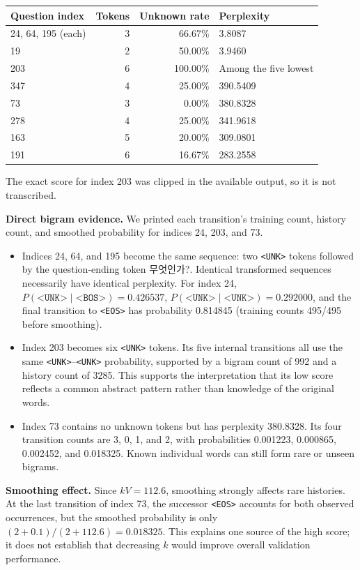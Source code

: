 \documentclass[11pt,a4paper]{article}
\newcommand{\KO}[1]{{\koreanfont #1}}
\newcommand{\unk}{\texttt{<UNK>}}
\newcommand{\bos}{\texttt{<BOS>}}
\newcommand{\eos}{\texttt{<EOS>}}
\begin{document}
\begin{center}
\small
\begin{tabular}{lrrl}
\toprule
Question index & Tokens & Unknown rate & Perplexity \\
\midrule
24, 64, 195 (each) & 3 & 66.67\% & 3.8087 \\
19 & 2 & 50.00\% & 3.9460 \\
203 & 6 & 100.00\% & Among the five lowest \\
\midrule
347 & 4 & 25.00\% & 390.5409 \\
73 & 3 & 0.00\% & 380.8328 \\
278 & 4 & 25.00\% & 341.9618 \\
163 & 5 & 20.00\% & 309.0801 \\
191 & 6 & 16.67\% & 283.2558 \\
\bottomrule
\end{tabular}
\end{center}
The exact score for index 203 was clipped in the available output, so it is not transcribed.

\textbf{Direct bigram evidence.} We printed each transition's training count, history count, and smoothed probability for indices 24, 203, and 73.
\begin{itemize}
\item Indices 24, 64, and 195 become the same sequence: two \unk{} tokens followed by the question-ending token \KO{무엇인가?}. Identical transformed sequences necessarily have identical perplexity. For index 24, $P(\unk{}\mid\bos{})=0.426537$, $P(\unk{}\mid\unk{})=0.292000$, and the final transition to \eos{} has probability 0.814845 (training counts 495/495 before smoothing).
\item Index 203 becomes six \unk{} tokens. Its five internal transitions all use the same \unk{}--\unk{} probability, supported by a bigram count of 992 and a history count of 3285. This supports the interpretation that its low score reflects a common abstract pattern rather than knowledge of the original words.
\item Index 73 contains no unknown tokens but has perplexity 380.8328. Its four transition counts are 3, 0, 1, and 2, with probabilities 0.001223, 0.000865, 0.002452, and 0.018325. Known individual words can still form rare or unseen bigrams.
\end{itemize}

\textbf{Smoothing effect.} Since $kV=112.6$, smoothing strongly affects rare histories. At the last transition of index 73, the successor \eos{} accounts for both observed occurrences, but the smoothed probability is only $(2+0.1)/(2+112.6)=0.018325$. This explains one source of the high score; it does not establish that decreasing $k$ would improve overall validation performance.
\end{document}
